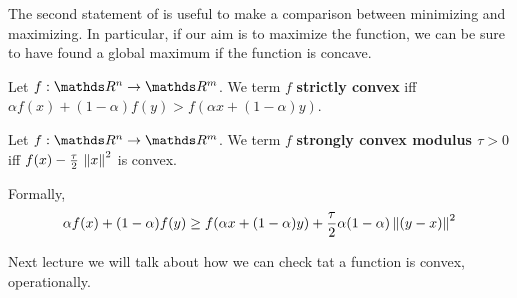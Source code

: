 \documentclass[computationalMathematics.tex]{subfiles}
\begin{document}
The second statement of  is useful to make a comparison between minimizing and maximizing. In particular, if our aim is to maximize the function, we can be sure to have found a global maximum if the function is concave.

\begin{definition}
  Let $f: \R^n \to \R^m$. We term $f$ \textbf{strictly convex} iff $\alpha f(x) + (1 - \alpha) f(y) > f(\alpha x + (1 - \alpha) y )$.
\end{definition}


\begin{definition}
  Let $f: \R^n \to \R^m$. We term $f$ \textbf{strongly convex modulus $\tau > 0$} iff $f(x) - \frac{\tau}{2}\,\left\lVert x\right\rVert^2$ is convex.
  
  Formally,
 \[
   \alpha f(x) + (1 - \alpha) f(y) \geq f(\alpha x + (1 - \alpha) y)+ \frac{\tau}{2} \alpha (1 - \alpha) \left\lVert(y - x)\right\rVert^2
 \]
\end{definition}

Next lecture we will talk about how we can check tat a function is convex, operationally.
\end{document}
